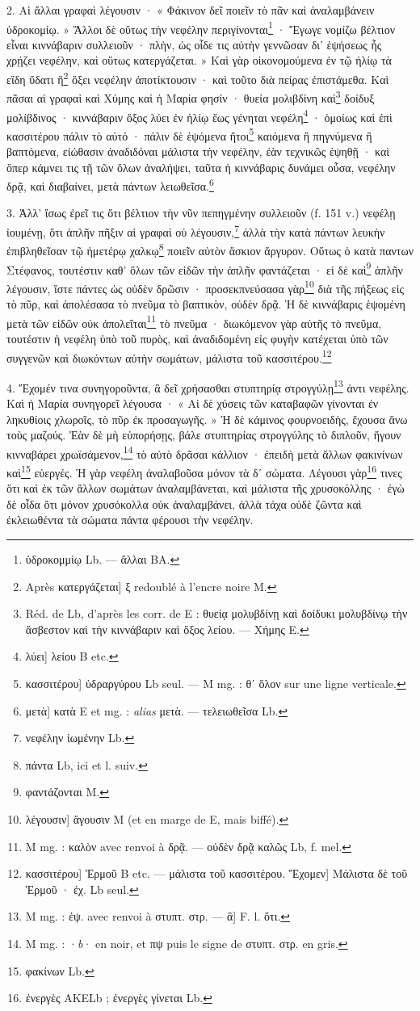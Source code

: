 \documentclass[landscape, a4paper, 11pt, oneside, polutonikogreek, french]{article}
\begin{document}
2. Αἱ ἄλλαι γραφαὶ λέγουσιν · « Φάκινον δεῖ ποιεῖν τὸ πᾶν καὶ ἀναλαμβάνειν ὑδροκομίῳ. » Ἄλλοι δὲ οὕτως τὴν νεφέλην περιγίνονται\footnote{ὑδροκομμίῳ Lb. --- ἄλλαι BA.} · Ἔγωγε νομίζω βέλτιον εἶναι κιννάβαριν συλλειοῦν · πλὴν, ὡς οἶδε τις αὐτὴν γεννῶσαν δι' ἑψήσεως ἧς χρῄζει νεφέλην, καὶ οὕτως κατεργάζεται. » Καὶ γὰρ οἰκονομούμενα ἐν τῷ ἡλίῳ τὰ εἴδη ὕδατι ἢ\footnote{Après κατεργάζεται] ξ redoublé à l'encre noire M.} ὄξει νεφέλην ἀποτίκτουσιν · καὶ τοῦτο διὰ πείρας ἐπιστάμεθα. Καὶ πᾶσαι αἱ γραφαὶ καὶ Χύμης καὶ ἡ Μαρία φησίν · θυεία μολιβδίνη καὶ\footnote{Réd. de Lb, d'après les corr. de E : θυείᾳ μολυβδίνῃ καὶ δοίδυκι μολυβδίνῳ τὴν ἄσβεστον καὶ τὴν κιννάβαριν καὶ ὄξος λείου. --- Χήμης E.} δοίδυξ μολίβδινος · κιννάβαριν ὄξος λύει ἐν ἡλίῳ ἕως γένηται νεφέλη\footnote{λύει] λείου B etc.} · ὁμοίως καὶ ἐπὶ κασσιτέρου πάλιν τὸ αὐτό · πάλιν δὲ ἑψόμενα ἤτοι\footnote{κασσιτέρου] ὑδραργύρου Lb seul. --- M mg. : θʹ ὅλον sur une ligne verticale.} καιόμενα ἢ πηγνύμενα ἢ βαπτόμενα, εἰώθασιν ἀναδιδόναι μάλιστα τὴν νεφέλην, ἐὰν τεχνικῶς ἑψηθῇ · καὶ ὅπερ κάμνει τις τῇ τῶν ὅλων ἀναλήψει, ταῦτα ἡ κιννάβαρις δυνάμει οὖσα, νεφέλην δρᾷ, καὶ διαβαίνει, μετὰ πάντων λειωθεῖσα.\footnote{μετὰ] κατὰ E et mg. : \emph{alias} μετὰ. --- τελειωθεῖσα Lb.}

3. Ἀλλ' ἴσως ἐρεῖ τις ὅτι βέλτιον τὴν νῦν πεπηγμένην συλλειοῦν (f. 151 v.) νεφέλῃ ἰουμένῃ, ὅτι ἁπλῆν πῆξιν αἱ γραφαὶ οὐ λέγουσιν,\footnote{νεφέλην ἰωμένην Lb.} ἀλλὰ τὴν κατὰ πάντων λευκὴν ἐπιβληθεῖσαν τῷ ἡμετέρῳ χαλκῳ\footnote{πάντα Lb, ici et l. suiv.} ποιεῖν αὐτὸν ἄσκιον ἄργυρον. Οὕτως ὁ κατὰ παντων Στέφανος, τουτέστιν καθ' ὅλων τῶν εἰδῶν τὴν ἁπλῆν φαντάζεται · εἰ δὲ καὶ\footnote{φαντάζονται M.} ἁπλῆν λέγουσιν, ἴστε πάντες ὡς οὐδὲν δρῶσιν · προσεκπνεύσασα γὰρ\footnote{λέγουσιν] ἄγουσιν M (et en marge de E, mais biffé).} διὰ τῆς πήξεως εἰς τὸ πῦρ, καὶ ἀπολέσασα τὸ πνεῦμα τὸ βαπτικὸν, οὐδὲν δρᾷ. Ἡ δὲ κιννάβαρις ἑψομένη μετὰ τῶν εἰδῶν οὐκ ἀπολεῖται\footnote{M mg. : καλὸν avec renvoi à δρᾷ. --- οὐδὲν δρᾷ καλῶς Lb, f. mel.} τὸ πνεῦμα · διωκόμενον γὰρ αὐτῆς τὸ πνεῦμα, τουτέστιν ἡ νεφέλη ὑπὸ τοῦ πυρὸς, καὶ ἀναδιδομένη εἰς φυγὴν κατέχεται ὑπὸ τῶν συγγενῶν καὶ διωκόντων αὐτὴν σωμάτων, μάλιστα τοῦ κασσιτέρου.\footnote{κασσιτέρου] Ἐρμοῦ B etc. --- μάλιστα τοῦ κασσιτέρου. Ἔχομεν] Μάλιστα δὲ τοῦ Ἑρμοῦ · ἐχ. Lb seul.}

4. Ἔχομέν τινα συνηγοροῦντα, ἃ δεῖ χρήσασθαι στυπτηρίᾳ στρογγύλῃ\footnote{M mg. : ἐψ. avec renvoi à στυπτ. στρ. --- ἃ] F. l. ὅτι.} ἀντι νεφέλης. Καὶ ἡ Μαρία συνηγορεῖ λέγουσα · « Αἱ δὲ χύσεις τῶν καταβαφῶν γίνονται ἐν ληκυθίοις χλωροῖς, τὸ πῦρ ἐκ προσαγωγῆς. » Ἡ δὲ κάμινος φουρνοειδὴς, ἔχουσα ἄνω τοὺς μαζούς. Ἐὰν δὲ μὴ εὐπορήσῃς, βάλε στυπτηρίας στρογγύλης τὸ διπλοῦν, ἤγουν κινναβάρει χρωϊσάμενον,\footnote{M mg. : ·\emph{b}· en noir, et πψ puis le signe de στυπτ. στρ. en gris.} τὸ αὐτὸ δρᾶσαι κάλλιον · ἐπειδὴ μετὰ ἄλλων φακινίνων καὶ\footnote{φακίνων Lb.} εὐεργές. Ἡ γὰρ νεφέλη ἀναλαβοῦσα μόνον τὰ δʹ σώματα. Λέγουσι γὰρ\footnote{ἐνεργὲς AΚELb ; ἐνεργὲς γίνεται Lb.} τινες ὅτι καὶ ἐκ τῶν ἄλλων σωμάτων ἀναλαμβάνεται, καὶ μάλιστα τῆς χρυσοκόλλης · ἐγὼ δὲ οἶδα ὅτι μόνον χρυσόκολλα οὐκ ἀναλαμβάνει, ἀλλὰ τάχα οὐδὲ ζῶντα καὶ ἐκλειωθέντα τὰ σώματα πάντα φέρουσι τὴν νεφέλην.
\end{document}
